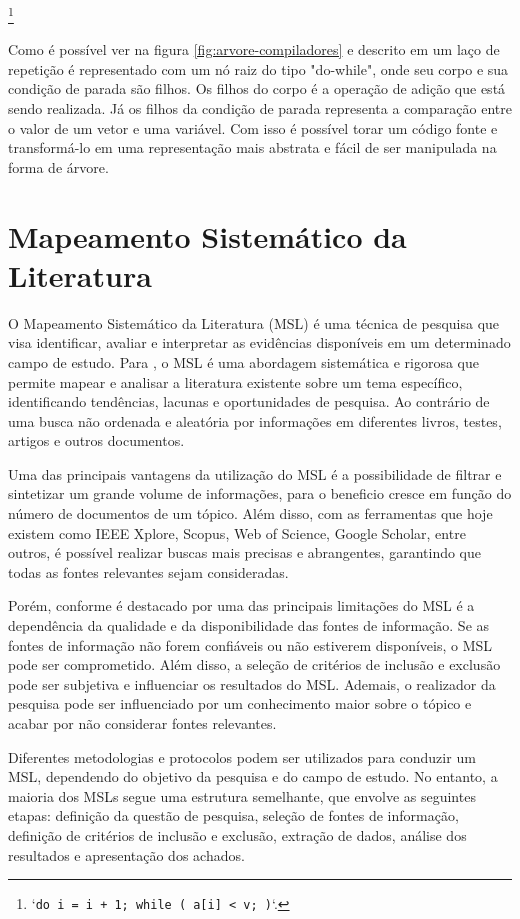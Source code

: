 \footnote[1]{`\texttt{do i = i + 1; while ( a[i] < v; )}`.}

Como é possível ver na figura \ref{fig:arvore-compiladores} e descrito em \cite{compiladores} um laço de repetição é representado com um nó raiz do tipo "do-while", onde seu corpo e sua condição de parada são filhos. Os filhos do corpo é a operação de adição que está sendo realizada. Já os filhos da condição de parada representa a comparação entre o valor de um vetor e uma variável. Com isso é possível torar um código fonte e transformá-lo em uma representação mais abstrata e fácil de ser manipulada na forma de árvore.

\section{Mapeamento Sistemático da Literatura}

O Mapeamento Sistemático da Literatura (MSL) é uma técnica de pesquisa que visa identificar, avaliar e interpretar as evidências disponíveis em um determinado campo de estudo. Para \cite{srufrj}, o MSL é uma abordagem sistemática e rigorosa que permite mapear e analisar a literatura existente sobre um tema específico, identificando tendências, lacunas e oportunidades de pesquisa. Ao contrário de uma busca não ordenada e aleatória por informações em diferentes livros, testes, artigos e outros documentos.

Uma das principais vantagens da utilização do MSL é a possibilidade de filtrar e sintetizar um grande volume de informações, para \cite{researchsynthesis} o beneficio cresce em função do número de documentos de um tópico. Além disso, com as ferramentas que hoje existem como IEEE Xplore, Scopus, Web of Science, Google Scholar, entre outros, é possível realizar buscas mais precisas e abrangentes, garantindo que todas as fontes relevantes sejam consideradas.

Porém, conforme é destacado por \cite{srufrj} uma das principais limitações do MSL é a dependência da qualidade e da disponibilidade das fontes de informação. Se as fontes de informação não forem confiáveis ou não estiverem disponíveis, o MSL pode ser comprometido. Além disso, a seleção de critérios de inclusão e exclusão pode ser subjetiva e influenciar os resultados do MSL. Ademais, o realizador da pesquisa pode ser influenciado por um conhecimento maior sobre o tópico e acabar por não considerar fontes relevantes.

Diferentes metodologias e protocolos podem ser utilizados para conduzir um MSL, dependendo do objetivo da pesquisa e do campo de estudo. No entanto, a maioria dos MSLs segue uma estrutura semelhante, que envolve as seguintes etapas: definição da questão de pesquisa, seleção de fontes de informação, definição de critérios de inclusão e exclusão, extração de dados, análise dos resultados e apresentação dos achados.

